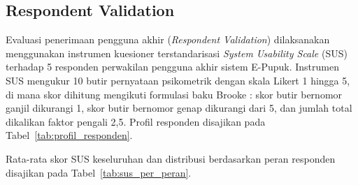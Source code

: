 ﻿\documentclass[conference]{IEEEtran}
\begin{document}
\subsection{Respondent Validation}
Evaluasi penerimaan pengguna akhir (\textit{Respondent Validation}) dilaksanakan menggunakan instrumen kuesioner terstandarisasi \textit{System Usability Scale} (SUS) terhadap 5 responden perwakilan pengguna akhir sistem E-Pupuk. Instrumen SUS mengukur 10 butir pernyataan psikometrik dengan skala Likert 1 hingga 5, di mana skor dihitung mengikuti formulasi baku Brooke \cite{b14}: skor butir bernomor ganjil dikurangi 1, skor butir bernomor genap dikurangi dari 5, dan jumlah total dikalikan faktor pengali 2,5. Profil responden disajikan pada Tabel~\ref{tab:profil_responden}.

\begin{table}[htbp]
\caption{Profil Responden Pengujian Usabilitas SUS ($n = 5$)}
\begin{center}
\label{tab:profil_responden}
\end{center}
\end{table}

Rata-rata skor SUS keseluruhan dan distribusi berdasarkan peran responden disajikan pada Tabel~\ref{tab:sus_per_peran}.
\end{document}
